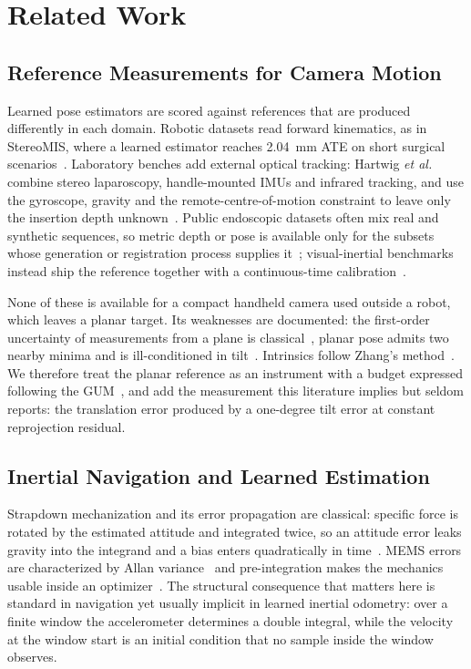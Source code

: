 \section{Related Work}

\subsection{Reference Measurements for Camera Motion}
Learned pose estimators are scored against references that are produced
differently in each domain. Robotic
datasets read forward kinematics, as in StereoMIS, where a learned estimator
reaches 2.04~mm ATE on short surgical
scenarios~\cite{hayoz2023pose}. Laboratory benches add external optical
tracking: Hartwig \emph{et al.} combine stereo laparoscopy, handle-mounted
IMUs and infrared tracking, and use the gyroscope, gravity and the
remote-centre-of-motion constraint to leave only the insertion depth
unknown~\cite{hartwig2022constrained}. Public
endoscopic datasets often mix real and synthetic sequences, so metric depth
or pose is available only for the subsets whose generation or registration
process supplies it~\cite{ozyoruk2021endoslam}; visual-inertial benchmarks instead ship
the reference together with a continuous-time
calibration~\cite{burri2016euroc,furgale2013unified}.

None of these is available for a compact handheld camera used outside a
robot, which leaves a planar target. Its weaknesses are documented: the
first-order uncertainty of measurements from a
plane is classical~\cite{criminisi1999plane}, planar pose admits two nearby
minima and is ill-conditioned in
tilt~\cite{schweighofer2006robust}. Intrinsics follow Zhang's
method~\cite{zhang2000flexible}. We therefore treat the planar reference as an
instrument with a budget expressed following the GUM~\cite{gum2008}, and add
the measurement this literature implies but seldom reports: the translation
error produced by a one-degree tilt error at constant reprojection residual.

\subsection{Inertial Navigation and Learned Estimation}
Strapdown mechanization and its error propagation are classical: specific
force is rotated by the estimated attitude and integrated twice, so an
attitude error leaks gravity into the integrand and a bias enters
quadratically in time~\cite{titterton2004strapdown,kok2017using}. MEMS errors
are characterized by Allan variance~\cite{elsheimy2008allan} and
pre-integration makes the mechanics usable inside an
optimizer~\cite{forster2017preintegration}. The structural
consequence that matters here is standard in navigation yet usually implicit
in learned inertial odometry: over a finite window the accelerometer
determines a double integral, while the velocity at the window start is an
initial condition that no sample inside the window observes.


